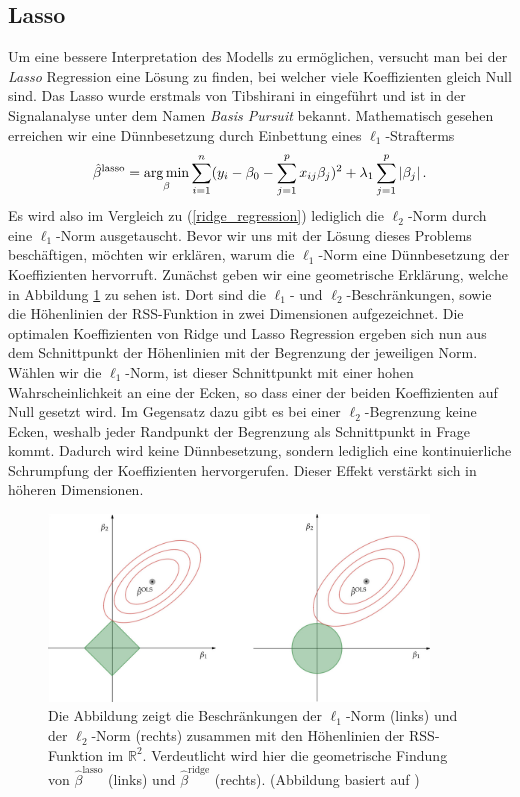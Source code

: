 \subsection{Lasso}
\label{lasso}

Um eine bessere Interpretation des Modells zu ermöglichen, versucht man bei der \textit{Lasso} Regression eine Lösung zu finden, bei welcher viele Koeffizienten gleich Null sind. Das Lasso wurde erstmals von Tibshirani in \cite{tibshirani_lasso} eingeführt und ist in der Signalanalyse unter dem Namen \textit{Basis Pursuit} \cite{chen} bekannt. Mathematisch gesehen erreichen wir eine Dünnbesetzung durch Einbettung eines $\ell_1$-Strafterms
\begin{align}
\label{lasso_formulation}
\hat{\beta}^{\text{lasso}} = \operatorname*{arg\,min}_{\beta} \sum_{i=1}^{n}(y_i - \beta_0 - \sum_{j=1}^p x_{ij}\beta_j)^2 + \lambda_1\sum_{j=1}^p \left|\beta_j\right|.
\end{align}
Es wird also im Vergleich zu (\ref{ridge_regression}) lediglich die $\ell_2$-Norm durch eine $\ell_1$-Norm ausgetauscht. Bevor wir uns mit der Lösung dieses Problems beschäftigen, möchten wir erklären, warum die $\ell_1$-Norm eine Dünnbesetzung der Koeffizienten hervorruft. Zunächst geben wir eine geometrische Erklärung, welche in Abbildung \ref{lasso_ridge_regression_figure} zu sehen ist. Dort sind die $\ell_1$- und $\ell_2$-Beschränkungen, sowie die Höhenlinien der RSS-Funktion in zwei Dimensionen aufgezeichnet. Die optimalen Koeffizienten von Ridge und Lasso Regression ergeben sich nun aus dem Schnittpunkt der Höhenlinien mit der Begrenzung der jeweiligen Norm. Wählen wir die $\ell_1$-Norm, ist dieser Schnittpunkt mit einer hohen Wahrscheinlichkeit an eine der Ecken, so dass einer der beiden Koeffizienten auf Null gesetzt wird. Im Gegensatz dazu gibt es bei einer $\ell_2$-Begrenzung keine Ecken, weshalb jeder Randpunkt der Begrenzung als Schnittpunkt in Frage kommt. Dadurch wird keine Dünnbesetzung, sondern lediglich eine kontinuierliche Schrumpfung der Koeffizienten hervorgerufen. Dieser Effekt verstärkt sich in höheren Dimensionen.

\begin{figure}
\centering
\includegraphics[width = 0.9\textwidth]{figures/lasso_ridge_regression.jpg}
\caption{Die Abbildung zeigt die Beschränkungen der $\ell_1$-Norm (links) und der $\ell_2$-Norm (rechts) zusammen mit den Höhenlinien der RSS-Funktion im $\mathbb{R}^2$. Verdeutlicht wird hier die geometrische Findung von $\hat{\beta}^{\text{lasso}}$ (links) und $\hat{\beta}^{\text{ridge}}$ (rechts). (Abbildung basiert auf \cite{hastie_elements})}
\label{lasso_ridge_regression_figure}
\end{figure}

